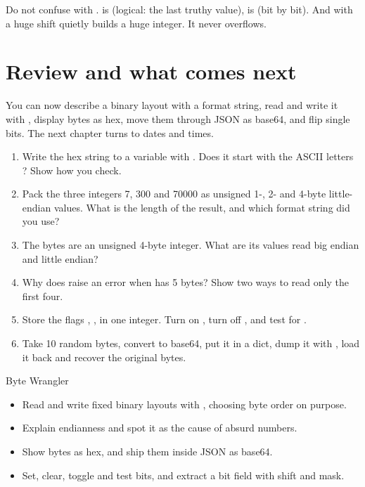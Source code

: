 \begin{trap}
Do not confuse \code{\&} with .  is  (logical: the last truthy
value),  is  (bit by bit). And \code{<{}<} with a huge shift quietly builds a
huge integer. It never overflows.
\end{trap}

\section{Review and what comes next}

You can now describe a binary layout with a format string, read and write it with ,
display bytes as hex, move them through JSON as base64, and flip single bits. The next chapter
turns to dates and times.

\begin{practice}
\begin{enumerate}[nosep,leftmargin=*]
  \item Write the hex string  to a  variable with
        . Does it start with the ASCII letters ? Show how you check.
  \item Pack the three integers 7, 300 and 70000 as unsigned 1-, 2- and 4-byte little-endian
        values. What is the length of the result, and which format string did you use?
  \item The bytes 
        are an unsigned 4-byte integer. What are its values read big endian and little endian?
  \item Why does  raise an error when  has 5 bytes?
        Show two ways to read only the first four.
  \item Store the flags , ,  in one integer. Turn on
        , turn off , and test for .
  \item Take 10 random bytes, convert to base64, put it in a dict, dump it with , load
        it back and recover the original bytes.
\end{enumerate}
\end{practice}

\begin{achievement}{Byte Wrangler}
\begin{itemize}[nosep,leftmargin=*]
  \item Read and write fixed binary layouts with , choosing byte order on purpose.
  \item Explain endianness and spot it as the cause of absurd numbers.
  \item Show bytes as hex, and ship them inside JSON as base64.
  \item Set, clear, toggle and test bits, and extract a bit field with shift and mask.
\end{itemize}
\end{achievement}
